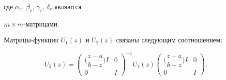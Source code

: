 где $\alpha_r$, $\beta_r$, $\gamma_r$, $\delta_r$ являются


$m \times m$-матрицами.





\begin{thm}


Матрицы-функции $U_1(z)$ и $U_2(z)$ связаны следующим соотношением\/${:}$


\begin{equation}


U_2(z)=\begin{pmatrix}


\bigg( \dfrac{z-a}{b-z} \bigg)I & 0 \\


0 & I


\end{pmatrix}^{-1}


U_1(z)


\begin{pmatrix}


\bigg( \dfrac{z-a}{b-z} \bigg)I & 0 \\


0 & I


\end{pmatrix}.


\end{equation}


\end{thm}





